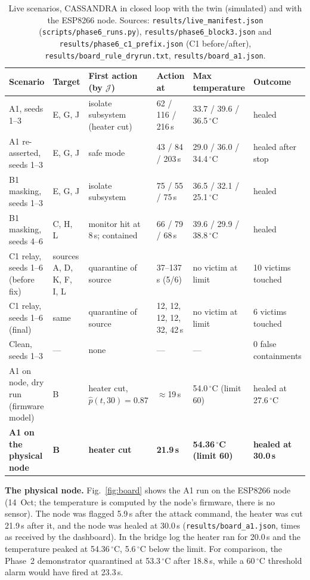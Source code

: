 \documentclass[conference]{IEEEtran}
\newcommand{\file}[1]{\texttt{#1}}
\newcommand{\degC}{$^{\circ}$C}
\newcommand{\Jcost}{\mathcal{J}}
\begin{document}
\begin{table}[t]
\caption{Live scenarios, CASSANDRA in closed loop with the twin (simulated) and with the ESP8266 node.
Sources: \file{results/live\_manifest.json} (\texttt{scripts/phase6\_runs.py}),
\file{results/phase6\_block3.json} and \file{results/phase6\_c1\_prefix.json} (C1 before/after),
\file{results/board\_rule\_dryrun.txt}, \file{results/board\_a1.json}.}
\label{tab:live}
\centering
\footnotesize
\setlength{\tabcolsep}{3pt}
\begin{tabular}{@{}p{34mm}p{20mm}p{32mm}p{26mm}p{30mm}p{24mm}@{}}
\toprule
Scenario & Target & First action (by $\Jcost$) & Action at & Max temperature & Outcome \\
\midrule
A1, seeds 1--3 & E, G, J & isolate subsystem (heater cut) & 62 / 116 / 216\,s & 33.7 / 39.6 / 36.5\,\degC & healed \\
A1 re-asserted, seeds 1--3 & E, G, J & safe mode & 43 / 84 / 203\,s & 29.0 / 36.0 / 34.4\,\degC & healed after stop \\
B1 masking, seeds 1--3 & E, G, J & isolate subsystem & 75 / 55 / 75\,s & 36.5 / 32.1 / 25.1\,\degC & healed \\
B1 masking, seeds 4--6 & C, H, L & monitor hit at 8\,s; contained & 66 / 79 / 68\,s & 39.6 / 29.9 / 38.8\,\degC & healed \\
C1 relay, seeds 1--6 (before fix) & sources A, D, K, F, I, L & quarantine of source & 37--137\,s (5/6) & no victim at limit & 10 victims touched \\
C1 relay, seeds 1--6 (final) & same & quarantine of source & 12, 12, 12, 12, 32, 42\,s & no victim at limit & 6 victims touched \\
Clean, seeds 1--3 & --- & none & --- & --- & 0 false containments \\
A1 on node, dry run (firmware model) & B & heater cut, $\hat p(t,30)=0.87$ & $\approx$19\,s & 54.0\,\degC{} (limit 60) & healed at 27.6\,\degC \\
\textbf{A1 on the physical node} & \textbf{B} & \textbf{heater cut} & \textbf{21.9\,s} & \textbf{54.36\,\degC{} (limit 60)} & \textbf{healed at 30.0\,s} \\
\bottomrule
\end{tabular}
\end{table}

\textbf{The physical node.} Fig.~\ref{fig:board} shows the A1 run on the ESP8266 node (14~Oct; the
temperature is computed by the node's firmware, there is no sensor). The node was flagged 5.9\,s after
the attack command, the heater was cut 21.9\,s after it, and the node was healed at 30.0\,s
(\file{results/board\_a1.json}, times as received by the dashboard). In the bridge log the heater ran for
20.0\,s and the temperature peaked at 54.36\,\degC, 5.6\,\degC{} below the limit. For comparison, the
Phase~2 demonstrator quarantined at 53.3\,\degC{} after 18.8\,s, while a 60\,\degC{} threshold alarm
would have fired at 23.3\,s.
\end{document}
